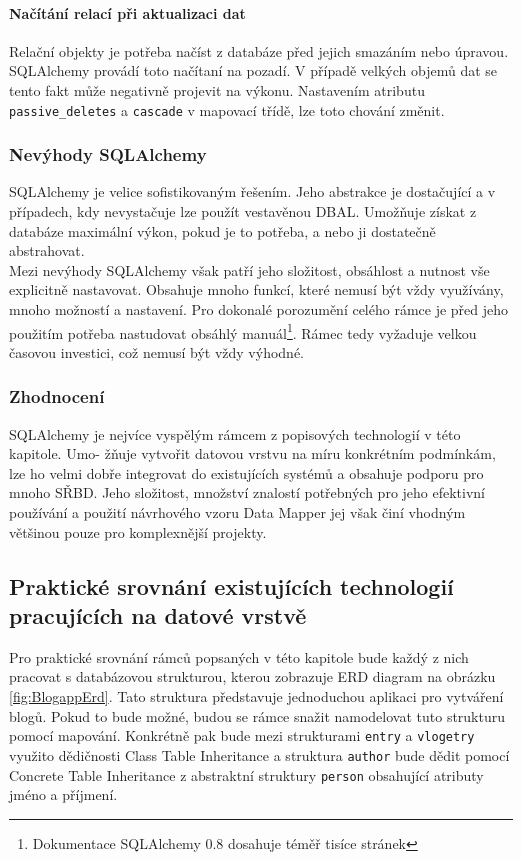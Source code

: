 \documentclass[ing,male,java,dept456]{diploma}						%
\begin{document}
\paragraph{Načítání relací při aktualizaci dat}
Relační objekty je potřeba načíst z databáze před jejich smazáním nebo úpravou. SQLAlchemy provádí toto načítaní na pozadí. V případě velkých objemů dat se tento fakt může negativně projevit na výkonu. Nastavením atributu \lstinline[style=inlinepython]|passive_deletes| a \lstinline[style=inlinepython]|cascade| v mapovací třídě, lze toto chování změnit.

\subsubsection{Nevýhody SQLAlchemy}
SQLAlchemy je velice sofistikovaným řešením. Jeho abstrakce je dostačující a v případech, kdy nevystačuje lze použít vestavěnou DBAL. Umožňuje získat z databáze maximální výkon, pokud je to potřeba, a nebo ji dostatečně abstrahovat. \\
Mezi nevýhody SQLAlchemy však patří jeho složitost, obsáhlost a nutnost vše explicitně nastavovat. Obsahuje mnoho funkcí, které nemusí být vždy využívány, mnoho možností a nastavení. Pro dokonalé porozumění celého rámce je před jeho použitím potřeba nastudovat obsáhlý manuál\footnote{Dokumentace SQLAlchemy 0.8 dosahuje téměř tisíce stránek}. Rámec tedy vyžaduje velkou časovou investici, což nemusí být vždy výhodné.

\subsubsection{Zhodnocení}

SQLAlchemy je nejvíce vyspělým rámcem z popisových technologií v této kapitole. Umo- žňuje vytvořit datovou vrstvu na míru konkrétním podmínkám, lze ho velmi dobře integrovat do existujících systémů a obsahuje podporu pro mnoho SŘBD. Jeho složitost, množství znalostí potřebných pro jeho efektivní používání a použití návrhového vzoru Data Mapper jej však činí vhodným většinou pouze pro komplexnější projekty.

\subsection{Praktické srovnání existujících technologií pracujících na datové vrstvě}
\label{subsec:CodeCompare}

Pro praktické srovnání rámců popsaných v této kapitole bude každý z nich pracovat s databázovou strukturou, kterou zobrazuje ERD diagram na obrázku \ref{fig:BlogappErd}. Tato struktura představuje jednoduchou aplikaci pro vytváření blogů. Pokud to bude možné, budou se rámce snažit namodelovat tuto strukturu pomocí mapování. Konkrétně pak bude mezi strukturami \lstinline[style=inlinepython]|entry| a \lstinline[style=inlinepython]|vlogetry| využito dědičnosti Class Table Inheritance a struktura \lstinline[style=inlinepython]|author| bude dědit pomocí Concrete Table Inheritance z abstraktní struktury \lstinline[style=inlinepython]|person| obsahující atributy jméno a příjmení. \\
\end{document}
